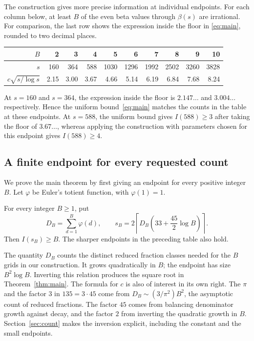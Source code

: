 The construction gives more precise information at individual
endpoints.  For each column below, at least $B$ of the even beta
values through $\beta(s)$ are irrational. For comparison, the last row
shows the expression inside the floor in \eqref{eq:main}, rounded to
two decimal places.
\begin{center}
\setlength{\tabcolsep}{5pt}
\begin{tabular}{@{}rrrrrrrrrr@{}}
\toprule
$B$&2&3&4&5&6&7&8&9&10\\
\midrule
$s$&160&364&588&1030&1296&1992&2502&3260&3828\\
\addlinespace[2pt]
$c\sqrt{s/\log s}$&2.15&3.00&3.67&4.66&5.14&6.19&6.84&7.68&8.24\\
\bottomrule
\end{tabular}
\end{center}
At $s=160$ and $s=364$, the expression inside the floor is
$2.147\ldots$ and $3.004\ldots$ respectively. Hence the uniform
bound~\eqref{eq:main} matches the counts in the table at these endpoints.
At $s=588$, the uniform bound gives $I(588)\ge3$ after taking the
floor of $3.67\ldots$, whereas applying the construction with
parameters chosen for this endpoint gives $I(588)\ge4$.

\subsection{A finite endpoint for every requested count}

We prove the main theorem by first giving an endpoint for every
positive integer $B$. Let $\varphi$ be Euler's totient function,
with $\varphi(1)=1$.

\begin{theorem}\label{thm:family}
For every integer $B\ge1$, put
\begin{equation}\label{eq:family}
 D_B=\sum_{d=1}^B\varphi(d),\qquad
 s_B=2\left\lceil D_B\left(33+\frac{45}{2}\log B\right)\right\rceil.
\end{equation}
Then $I(s_B)\ge B$. The sharper endpoints in the preceding table
also hold.
\end{theorem}

The quantity $D_B$ counts the distinct reduced fraction classes needed
for the $B$ grids in our construction. It grows quadratically in $B$;
the endpoint has size $B^2\log B$. Inverting this relation produces
the square root in Theorem~\ref{thm:main}.
The formula for $c$ is also of interest in its own right.
The $\pi$ and the factor $3$ in $135=3\cdot45$ come from
$D_B\sim(3/\pi^2)B^2$, the asymptotic count of reduced fractions.
The factor $45$ comes from balancing
denominator growth against decay, and the factor $2$ from
inverting the quadratic growth in $B$.
Section~\ref{sec:count}
makes the inversion explicit, including the constant and the small
endpoints.

